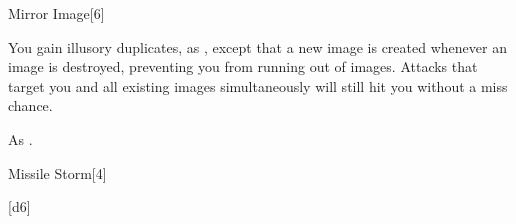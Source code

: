 \begin{spellsection}[Greater]{Mirror Image}[6]
    \begin{spellheader}
    \end{spellheader}
    \begin{spellcontent}
        \begin{spelltargetinginfo}
        \end{spelltargetinginfo}
        \begin{spelleffects}
            \spelleffect You gain illusory duplicates, as , except that a new image is created whenever an image is destroyed, preventing you from running out of images.
            Attacks that target you and all existing images simultaneously will still hit you without a miss chance.
            \spelldur \durshort \dismissable
        \end{spelleffects}
    \end{spellcontent}
    \begin{spellfooter}
        \spellnotes As .
        \miscastexplode
    \end{spellfooter}
\end{spellsection}

\begin{spellsection}{Missile Storm}[4]
    \begin{spellheader}
    \end{spellheader}
    \begin{spellcontent}
        \begin{spelltargetinginfo}
        \end{spelltargetinginfo}
        \begin{spelleffects}
            \spelleffect {}[d6]
        \end{spelleffects}
    \end{spellcontent}
    \begin{spellfooter}
        \spellnotes \forcespellnotes
        \miscastexplode
    \end{spellfooter}
\end{spellsection}

